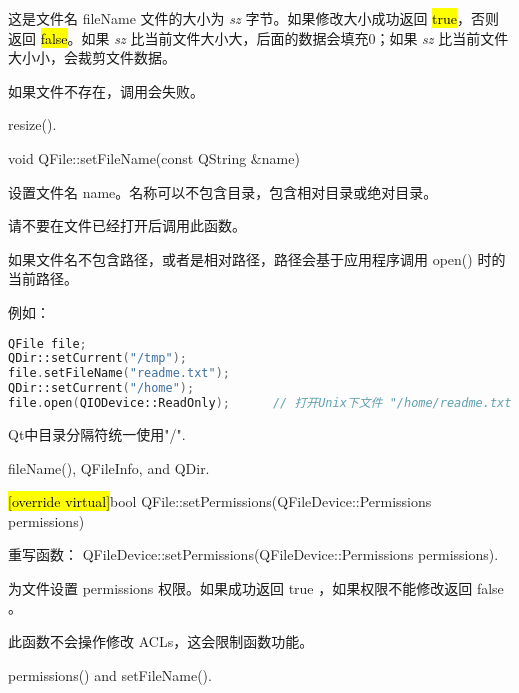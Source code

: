 这是文件名 fileName 文件的大小为 \emph{sz} 字节。如果修改大小成功返回 \hl{true}，否则返回 \hl{false}。如果 \emph{sz} 比当前文件大小大，后面的数据会填充0；如果 \emph{sz} 比当前文件大小小，会裁剪文件数据。



\begin{notice}[警告]
如果文件不存在，调用会失败。
\end{notice}

\begin{notice}[另请参阅]
resize().
\end{notice}

void QFile::setFileName(const QString \&name)

设置文件名 name。名称可以不包含目录，包含相对目录或绝对目录。

请不要在文件已经打开后调用此函数。

如果文件名不包含路径，或者是相对路径，路径会基于应用程序调用 open() 时的当前路径。

例如：

\begin{lstlisting}[language=C++]
QFile file;
QDir::setCurrent("/tmp");
file.setFileName("readme.txt");
QDir::setCurrent("/home");
file.open(QIODevice::ReadOnly);      // 打开Unix下文件 "/home/readme.txt"
\end{lstlisting}



\begin{notice}
Qt中目录分隔符统一使用"/".
\end{notice}

\begin{notice}[另请参阅]
fileName(), QFileInfo, and QDir.
\end{notice}

\splitLine

\hl{[override virtual]}bool QFile::setPermissions(QFileDevice::Permissions permissions)

重写函数： QFileDevice::setPermissions(QFileDevice::Permissions permissions).

为文件设置 permissions 权限。如果成功返回 true ，如果权限不能修改返回 false 。



\begin{notice}[警告]
此函数不会操作修改 ACLs，这会限制函数功能。
\end{notice}

\begin{notice}[另请参阅]
permissions() and setFileName().
\end{notice}

